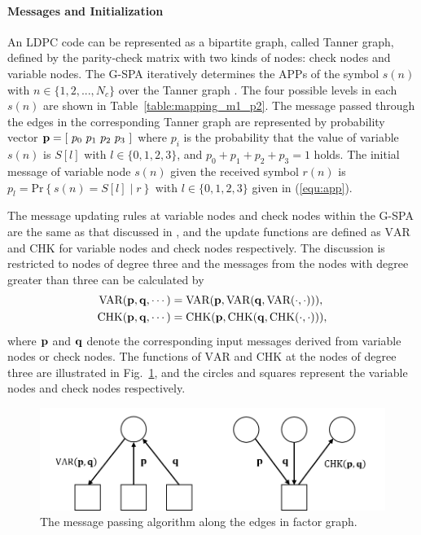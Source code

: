 \paragraph{Messages and Initialization}

An LDPC code can be represented as a bipartite graph, called Tanner graph, defined by the parity-check matrix with two kinds of nodes: check nodes and variable nodes. The G-SPA iteratively determines the APPs of the symbol $s(n)$ with $n \in \{1, 2, ..., N_c\}$ over the Tanner graph \cite{spa01}. The four possible levels in each $s(n)$ are shown in Table~\ref{table:mapping_m1_p2}. The message passed through the edges in the corresponding Tanner graph are represented by probability vector ${\bf p} = [ \ p_0 \ p_1 \ p_2 \ p_3 \ ]$ where $p_i$ is the probability that the value of variable $s(n)$ is $S[l]$ with $l \in \{0, 1, 2, 3\}$, and $ p_0+p_1+p_2+p_3=1$ holds. The initial message of variable node $s(n)$ given the received symbol $r(n)$ is $p_{l} = \text{Pr}\left\{s(n) = S[l]\middle|r\right\}$ with $l \in \{0, 1, 2, 3\}$ given in (\ref{equ:app}). 

The message updating rules at variable nodes and check nodes within the G-SPA are the same as that discussed in \cite{spa01}, and the update functions are defined as $\text{VAR}$ and $\text{CHK}$ for variable nodes and check nodes respectively. The discussion is restricted to nodes of degree three and the messages from the nodes with degree greater than three can be calculated by
\begin{align}
 \text{VAR}({\bf p}, {\bf q}, \cdots) & = {\textrm{VAR}}({\bf p}, {\textrm{VAR}}({\bf q}, {\textrm{VAR}}(\cdot, \cdot))) , \nonumber \\
 \text{CHK}({\bf p}, {\bf q}, \cdots) & = {\textrm{CHK}}({\bf p}, {\textrm{CHK}}({\bf q}, {\textrm{CHK}}(\cdot, \cdot))) ,
\end{align}
where ${\bf p}$ and ${\bf q}$ denote the corresponding input messages derived from variable nodes or check nodes. The functions of $\text{VAR}$ and $\text{CHK}$ at the nodes of degree three are illustrated in Fig.~\ref{fig:gspa_msg}, and the circles and squares represent the variable nodes and check nodes respectively. 

\begin{figure}[b!]
 \centering
 \includegraphics[width=15cm]{fig/gspa_msg.png}
 \caption{The message passing algorithm along the edges in factor graph.}
 \label{fig:gspa_msg}
\end{figure}

